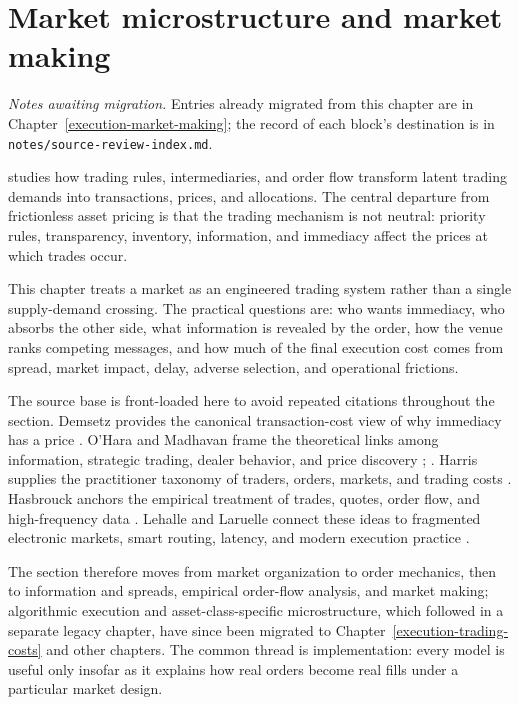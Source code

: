 \chapter{Market microstructure and market making}\label{legacy:execution-market-making}

\noindent\emph{Notes awaiting migration.} Entries already migrated from this chapter are in Chapter~\ref{execution-market-making}; the record of each block's destination is in \texttt{notes/source-review-index.md}.

 studies how trading rules, intermediaries, and order flow transform latent trading demands into transactions, prices, and allocations. The central departure from frictionless asset pricing is that the trading mechanism is not neutral: priority rules, transparency, inventory, information, and immediacy affect the prices at which trades occur.

This chapter treats a market as an engineered trading system rather than a single supply-demand crossing. The practical questions are: who wants immediacy, who absorbs the other side, what information is revealed by the order, how the venue ranks competing messages, and how much of the final execution cost comes from spread, market impact, delay, adverse selection, and operational frictions.

The source base is front-loaded here to avoid repeated citations throughout the section. Demsetz provides the canonical transaction-cost view of why immediacy has a price \citep{demsetz-1968}. O'Hara and Madhavan frame the theoretical links among information, strategic trading, dealer behavior, and price discovery \citep{catalogue-0496}; \citep{madhavan-2000}. Harris supplies the practitioner taxonomy of traders, orders, markets, and trading costs \citep{alpha-harris}. Hasbrouck anchors the empirical treatment of trades, quotes, order flow, and high-frequency data \citep{s6-hasbrouck}. Lehalle and Laruelle connect these ideas to fragmented electronic markets, smart routing, latency, and modern execution practice \citep{alpha-laruelle}.

The section therefore moves from market organization to order mechanics, then to information and spreads, empirical order-flow analysis, and market making; algorithmic execution and asset-class-specific microstructure, which followed in a separate legacy chapter, have since been migrated to Chapter~\ref{execution-trading-costs} and other chapters. The common thread is implementation: every model is useful only insofar as it explains how real orders become real fills under a particular market design.



\newpage


\newpage


\newpage

